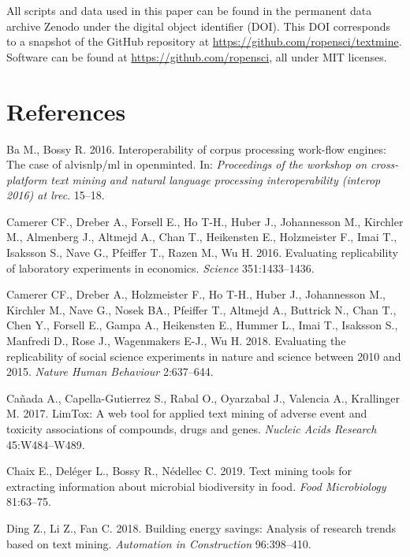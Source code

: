 \documentclass[author-year, review, 11pt]{components/elsarticle} %
\begin{document}
All scripts and data used in this paper can be found in the permanent
data archive Zenodo under the digital object identifier (DOI). This DOI
corresponds to a snapshot of the GitHub repository at
\url{https://github.com/ropensci/textmine}. Software can be found at
\url{https://github.com/ropensci}, all under MIT licenses.

\hypertarget{references}{%
\section*{References}\label{references}}

\hypertarget{refs}{}
\leavevmode\hypertarget{ref-ba2016interoperability}{}%
Ba M., Bossy R. 2016. Interoperability of corpus processing work-flow
engines: The case of alvisnlp/ml in openminted. In: \emph{Proceedings of
the workshop on cross-platform text mining and natural language
processing interoperability (interop 2016) at lrec}. 15--18.

\leavevmode\hypertarget{ref-Camerer2016}{}%
Camerer CF., Dreber A., Forsell E., Ho T-H., Huber J., Johannesson M.,
Kirchler M., Almenberg J., Altmejd A., Chan T., Heikensten E.,
Holzmeister F., Imai T., Isaksson S., Nave G., Pfeiffer T., Razen M., Wu
H. 2016. Evaluating replicability of laboratory experiments in
economics. \emph{Science} 351:1433--1436.

\leavevmode\hypertarget{ref-Camerer2018}{}%
Camerer CF., Dreber A., Holzmeister F., Ho T-H., Huber J., Johannesson
M., Kirchler M., Nave G., Nosek BA., Pfeiffer T., Altmejd A., Buttrick
N., Chan T., Chen Y., Forsell E., Gampa A., Heikensten E., Hummer L.,
Imai T., Isaksson S., Manfredi D., Rose J., Wagenmakers E-J., Wu H.
2018. Evaluating the replicability of social science experiments in
nature and science between 2010 and 2015. \emph{Nature Human Behaviour}
2:637--644.

\leavevmode\hypertarget{ref-Canada2017}{}%
Cañada A., Capella-Gutierrez S., Rabal O., Oyarzabal J., Valencia A.,
Krallinger M. 2017. LimTox: A web tool for applied text mining of
adverse event and toxicity associations of compounds, drugs and genes.
\emph{Nucleic Acids Research} 45:W484--W489.

\leavevmode\hypertarget{ref-Chaix2019}{}%
Chaix E., Deléger L., Bossy R., Nédellec C. 2019. Text mining tools for
extracting information about microbial biodiversity in food. \emph{Food
Microbiology} 81:63--75.

\leavevmode\hypertarget{ref-Ding2018}{}%
Ding Z., Li Z., Fan C. 2018. Building energy savings: Analysis of
research trends based on text mining. \emph{Automation in Construction}
96:398--410.
\end{document}
